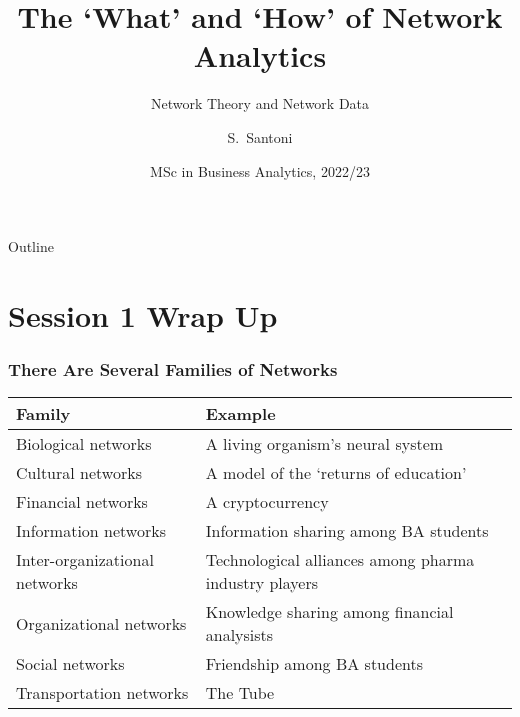 \documentclass[notes, aspectratio=1610]{beamer}
\title[Network Theory and Network Data]
{The `What' and `How' of Network Analytics}
\subtitle{Network Theory and Network Data}
\author{S.~Santoni\inst{1}\inst{2}}
\institute{
	\inst{1}%
	Bayes Business School
	\and
	\inst{2}%
	Soundcloud
	}
\date{MSc in Business Analytics, 2022/23}
\begin{document}
\begin{frame}
	\titlepage
\end{frame}

\begin{frame}{Outline}
	\tableofcontents
\end{frame}

\section{Session 1 Wrap Up}

\begin{frame}
	\frametitle{There Are Several Families of Networks}
	\begin{table}
		\begin{small}
		\begin{center}
		\begin{tabular}[c]{|l|l|}
			\hline
			\textbf{Family} & 
			\textbf{Example} \\
			\hline 
			Biological networks\dotfill
			& A living organism's neural system\\
		        Cultural networks\dotfill
			& A model of the `returns of education'\\
			Financial networks\dotfill
			& A cryptocurrency\\
		        Information networks\dotfill
			& Information sharing among BA students\\
			Inter-organizational networks\dotfill
			& Technological alliances among pharma industry players\\
		        Organizational networks\dotfill
			& Knowledge sharing among financial analysists\\
		        Social networks\dotfill
			& Friendship among BA students\\
		        Transportation networks\dotfill
			& The Tube\\				
			\hline
		\end{tabular}
		\end{center}
		\end{small}
	\end{table}
\end{frame}
\end{document}
